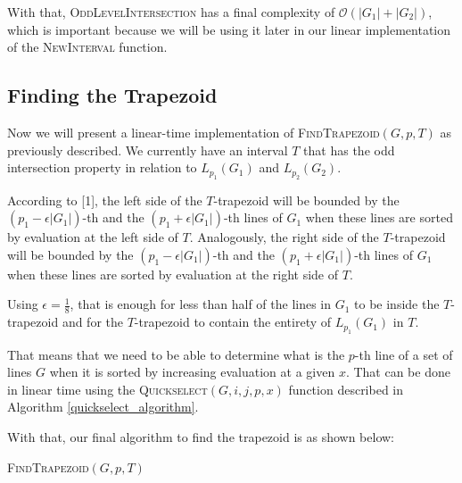 \documentclass{article}
\DeclarePairedDelimiter\floor{\lfloor}{\rfloor}
\def\bigo{\mathcal{O}}
\begin{document}
With that, \textsc{OddLevelIntersection} has a final complexity of $\bigo(|G_1|+|G_2|)$, which is important because we will be using it later in our linear implementation of the  \textsc{NewInterval} function.

\newpage
\subsection{Finding the Trapezoid}

Now we will present a linear-time implementation of \textsc{FindTrapezoid}$(G,p,T)$ as previously described. We currently have an interval $T$ that has the odd intersection property in relation to $L_{p_1}(G_1)$ and $L_{p_2}(G_2)$. 

According to [1], the left side of the $T$-trapezoid will be bounded by the $(p_1 - \epsilon |G_1|)$-th and the $(p_1 + \epsilon |G_1|)$-th lines of $G_1$ when these lines are sorted by evaluation at the left side of $T$. Analogously, the right side of the $T$-trapezoid will be bounded by the $(p_1 - \epsilon |G_1|)$-th and the $(p_1 + \epsilon |G_1|)$-th lines of $G_1$ when these lines are sorted by evaluation at the right side of $T$.

Using $\epsilon = \frac{1}{8}$, that is enough for less than half of the lines in $G_1$ to be inside the $T$-trapezoid and for the $T$-trapezoid to contain the entirety of $L_{p_1}(G_1)$ in $T$.

That means that we need to be able to determine what is the $p$-th line of a set of lines $G$ when it is sorted by increasing evaluation at a given $x$. That can be done in linear time using the \textsc{Quickselect}$(G,i,j,p,x)$ function described in Algorithm \ref{quickselect_algorithm}.

With that, our final algorithm to find the trapezoid is as shown below:

\newcommand{\offset}{\mathit{offset}}


\begin{algorithm}
\caption{\textsc{FindTrapezoid}$(G,p,T)$}
\label{find_trapezoid}
\end{algorithm}
\end{document}
